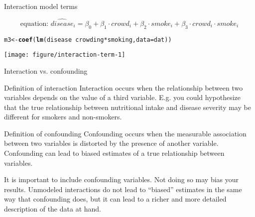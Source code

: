 \documentclass[table]{beamer}\usepackage[]{graphicx}\usepackage[]{color}
\makeatletter
\def\maxwidth{ %
  \ifdim\Gin@nat@width>\linewidth
    \linewidth
  \else
    \Gin@nat@width
  \fi
}
\newcommand{\hlopt}[1]{\textcolor[rgb]{0,0,0}{#1}}%
\newcommand{\hlstd}[1]{\textcolor[rgb]{0.345,0.345,0.345}{#1}}%
\newcommand{\hlkwb}[1]{\textcolor[rgb]{0.69,0.353,0.396}{#1}}%
\newcommand{\hlkwc}[1]{\textcolor[rgb]{0.333,0.667,0.333}{#1}}%
\newcommand{\hlkwd}[1]{\textcolor[rgb]{0.737,0.353,0.396}{\textbf{#1}}}%
\newenvironment{kframe}{%
 \def\at@end@of@kframe{}%
 \ifinner\ifhmode%
  \def\at@end@of@kframe{\end{minipage}}%
  \begin{minipage}{\columnwidth}%
 \fi\fi%
 \def\FrameCommand##1{\hskip\@totalleftmargin \hskip-\fboxsep
 \colorbox{shadecolor}{##1}\hskip-\fboxsep
     \hskip-\linewidth \hskip-\@totalleftmargin \hskip\columnwidth}%
 \MakeFramed {\advance\hsize-\width
   \@totalleftmargin\z@ \linewidth\hsize
   \@setminipage}}%
 {\par\unskip\endMakeFramed%
 \at@end@of@kframe}
\newenvironment{knitrout}{}{} %
\makeatother
\begin{document}

\begin{frame}[fragile]{Interaction model terms}

$$ \mbox{equation: \ }  \widehat{disease}_i = \beta_0 + \beta_1\cdot crowd_i + \beta_2\cdot smoke_i + \beta_3\cdot crowd_i \cdot smoke_i  $$

\begin{knitrout}\scriptsize
{}\color{fgcolor}\begin{kframe}
\begin{alltt}
\hlstd{m3} \hlkwb{<-} \hlkwd{coef}\hlstd{(}\hlkwd{lm}\hlstd{(disease} \hlopt{~} \hlstd{crowding}\hlopt{*}\hlstd{smoking,} \hlkwc{data}\hlstd{=dat))}
\end{alltt}
\end{kframe}
\end{knitrout}


\begin{knitrout}\scriptsize
{}\color{fgcolor}
\texttt{[image: figure/interaction-term-1]} 
\end{knitrout}

\end{frame}


\begin{frame}{Interaction vs. confounding}

\begin{block}{Definition of interaction}
Interaction occurs when the relationship between two variables depends on the value of a third variable. E.g. you could hypothesize that the true relationship between nutritional intake and disease severity may be different for smokers and non-smokers.
\end{block}

\begin{block}{Definition of confounding}
Confounding occurs when the measurable association between two variables is distorted by the presence of another variable. Confounding can lead to biased estimates of a true relationship between variables.
\end{block}

\bi
    \myitem It is important to include confounding variables. Not doing so may bias your results.
    \myitem Unmodeled interactions do not lead to ``biased'' estimates in the same way that confounding does, but it can lead to a richer and more detailed description of the data at hand.
\ei


\end{frame}
\end{document}

